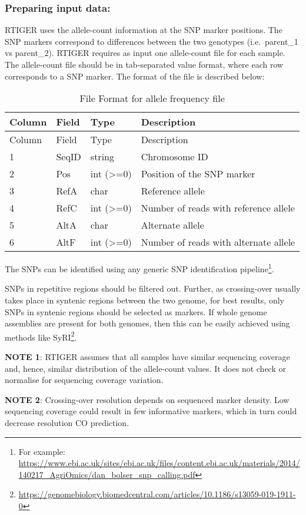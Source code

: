 \documentclass[]{article}
\let\rmarkdownfootnote\footnote%
\def\footnote{\protect\rmarkdownfootnote}
\begin{document}
\hypertarget{preparing-input-data}{%
\subsubsection{Preparing input data:}\label{preparing-input-data}}

RTIGER uses the allele-count information at the SNP marker positions.
The SNP markers correspond to differences between the two genotypes
(i.e.~parent\_1 vs parent\_2). RTIGER requires as input one allele-count
file for each sample. The allele-count file should be in tab-separated
value format, where each row corresponds to a SNP marker. The format of
the file is described below:

\begin{longtable}[]{@{}llll@{}}
\caption{File Format for allele frequency file}\tabularnewline
\toprule
Column & Field & Type & Description\tabularnewline
\midrule
\endfirsthead
\toprule
Column & Field & Type & Description\tabularnewline
\midrule
\endhead
1 & SeqID & string & Chromosome ID\tabularnewline
2 & Pos & int (\textgreater=0) & Position of the SNP
marker\tabularnewline
3 & RefA & char & Reference allele\tabularnewline
4 & RefC & int (\textgreater=0) & Number of reads with reference
allele\tabularnewline
5 & AltA & char & Alternate allele\tabularnewline
6 & AltF & int (\textgreater=0) & Number of reads with alternate
allele\tabularnewline
\bottomrule
\end{longtable}

The SNPs can be identified using any generic SNP identification
pipeline\footnote{For example:
  \url{https://www.ebi.ac.uk/sites/ebi.ac.uk/files/content.ebi.ac.uk/materials/2014/140217_AgriOmics/dan_bolser_snp_calling.pdf}}.

SNPs in repetitive regions should be filtered out. Further, as
crossing-over usually takes place in syntenic regions between the two
genome, for best results, only SNPs in syntenic regions should be
selected as markers. If whole genome assemblies are present for both
genomes, then this can be easily achieved using methods like
SyRI\footnote{\url{https://genomebiology.biomedcentral.com/articles/10.1186/s13059-019-1911-0}}.

\textbf{NOTE 1}: RTIGER assumes that all samples have similar sequencing
coverage and, hence, similar distribution of the allele-count values. It
does not check or normalise for sequencing coverage variation.

\textbf{NOTE 2}: Crossing-over resolution depends on sequenced marker
density. Low sequencing coverage could result in few informative
markers, which in turn could decrease resolution CO prediction.
\end{document}
